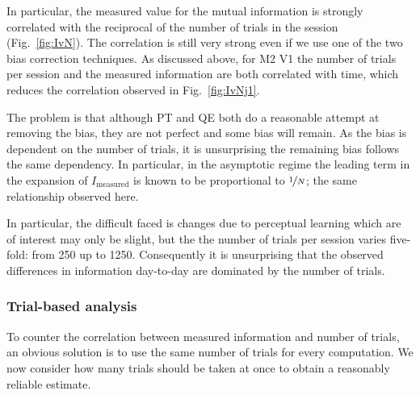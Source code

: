 In particular, the measured value for the mutual information is strongly correlated with the reciprocal of the number of trials in the session (Fig.~\ref{fig:IvN}). The correlation is still very strong even if we use one of the two bias correction techniques. As discussed above, for M2 V1 the number of trials per session and the measured information  are both correlated with time, which reduces the correlation observed in Fig.~\ref{fig:IvNj1}.

The problem is that although PT and QE both do a reasonable attempt at removing the bias, they are not perfect and some bias will remain. As the bias is dependent on the number of trials, it is unsurprising the remaining bias follows the same dependency.
In particular, in the asymptotic regime the leading term in the expansion of $I_{\text{measured}}$ is known to be proportional \cite{Treves1995} to $\nicefrac{1}{N}$; the same relationship observed here.

In particular, the difficult faced is changes due to perceptual learning which are of interest may only be slight, but the the number of trials per session varies five-fold: from 250 up to 1250. Consequently it is unsurprising that the observed differences in information day-to-day are dominated by the number of trials.

% 

\FloatBarrier
\subsubsection{Trial-based analysis}

To counter the correlation between measured information and number of trials, an obvious solution is to use the same number of trials for every computation. We now consider how many trials should be taken at once to obtain a reasonably reliable estimate.

